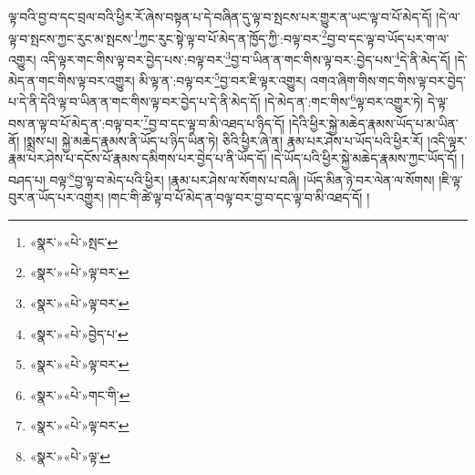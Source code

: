 ལྟ་བའི་བྱ་བ་དང་བྲལ་བའི་ཕྱིར་རོ་ཞེས་བསྟན་པ་དེ་བཞིན་དུ་ལྟ་བ་སྤངས་པར་གྱུར་ན་ཡང་ལྟ་བ་པོ་མེད་དོ། །དེ་ལ་ལྟ་བ་སྤངས་ཀྱང་རུང་མ་སྤངས་\footnote{«སྣར་»«པེ་»སྤང་}ཀྱང་རུང་སྟེ་ལྟ་བ་པོ་མེད་ན་ཁྱོད་ཀྱི་:བལྟ་བར་\footnote{«སྣར་»«པེ་»ལྟ་བར་}བྱ་བ་དང་ལྟ་བ་ཡོད་པར་ག་ལ་འགྱུར། འདི་ལྟར་གང་གིས་ལྟ་བར་བྱེད་པས་:བལྟ་བར་\footnote{«སྣར་»«པེ་»ལྟ་བར་}བྱ་བ་ཡིན་ན་གང་གིས་ལྟ་བར་:བྱེད་པས་\footnote{«སྣར་»«པེ་»བྱེད་པ་}དེ་ནི་མེད་དོ། །དེ་མེད་ན་གང་གིས་ལྟ་བར་འགྱུར། མི་ལྟ་ན་:བལྟ་བར་\footnote{«སྣར་»«པེ་»ལྟ་བར་}བྱ་བར་ཇི་ལྟར་འགྱུར། འགའ་ཞིག་གིས་གང་གིས་ལྟ་བར་བྱེད་པ་དེ་ནི་དེའི་ལྟ་བ་ཡིན་ན་གང་གིས་ལྟ་བར་བྱེད་པ་དེ་ནི་མེད་དོ། །དེ་མེད་ན་:གང་གིས་\footnote{«སྣར་»«པེ་»གང་གི་}ལྟ་བར་འགྱུར་ཏེ། དེ་ལྟ་བས་ན་ལྟ་བ་པོ་མེད་ན་:བལྟ་བར་\footnote{«སྣར་»«པེ་»ལྟ་བར་}བྱ་བ་དང་ལྟ་བ་མི་འཐད་པ་ཉིད་དོ། །དེའི་ཕྱིར་སྐྱེ་མཆེད་རྣམས་ཡོད་པ་མ་ཡིན་ནོ། །སྨྲས་པ། སྐྱེ་མཆེད་རྣམས་ནི་ཡོད་པ་ཉིད་ཡིན་ཏེ། ཅིའི་ཕྱིར་ཞེ་ན། རྣམ་པར་ཤེས་པ་ཡོད་པའི་ཕྱིར་རོ། །འདི་ལྟར་རྣམ་པར་ཤེས་པ་དངོས་པོ་རྣམས་དམིགས་པར་བྱེད་པ་ནི་ཡོད་དོ། །དེ་ཡོད་པའི་ཕྱིར་སྐྱེ་མཆེད་རྣམས་ཀྱང་ཡོད་དོ། །བཤད་པ། བལྟ་\footnote{«སྣར་»«པེ་»ལྟ་}བྱ་ལྟ་བ་མེད་པའི་ཕྱིར། །རྣམ་པར་ཤེས་ལ་སོགས་པ་བཞི། །ཡོད་མིན་ཉེ་བར་ལེན་ལ་སོགས། །ཇི་ལྟ་བུར་ན་ཡོད་པར་འགྱུར། །གང་གི་ཚེ་ལྟ་བ་པོ་མེད་ན་བལྟ་བར་བྱ་བ་དང་ལྟ་བ་མི་འཐད་དོ། །
